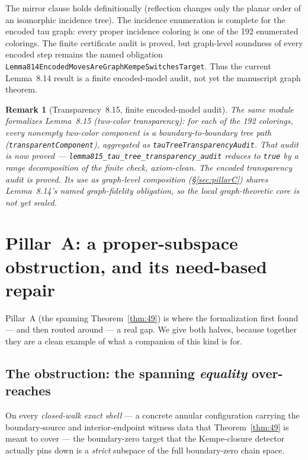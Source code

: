 \documentclass[11pt]{article}
\newtheorem{remark}{Remark}
\theoremstyle{definition}
\begin{document}
The mirror clause holds definitionally (reflection changes only the planar order
of an isomorphic incidence tree). The incidence enumeration is complete for the
encoded tau graph: every proper incidence coloring is one of the 192 enumerated
colorings. The finite certificate audit is proved, but graph-level soundness of
every encoded step remains the named obligation
\texttt{Lemma814EncodedMovesAreGraphKempeSwitchesTarget}. Thus the current
Lemma~8.14 result is a finite encoded-model audit, not yet the manuscript graph
theorem.

\begin{remark}[Transparency~8.15, finite encoded-model audit]
\label{rem:815}
The same module formalizes Lemma~8.15 (two-color transparency): for each of the
192 colorings, every nonempty two-color component is a boundary-to-boundary tree
path (\texttt{transparentComponent}), aggregated as
\texttt{tauTreeTransparencyAudit}. That audit is now \emph{proved} ---
\texttt{lemma815\_tau\_tree\_transparency\_audit} reduces to \texttt{true} by a
range decomposition of the finite check, axiom-clean. The encoded transparency audit is proved. Its use as graph-level composition
(\S\ref{sec:pillarC}) shares Lemma~8.14's named graph-fidelity obligation, so
the local graph-theoretic core is not yet sealed.
\end{remark}

\section{Pillar~A: a proper-subspace obstruction, and its need-based repair}
\label{sec:pillarA}

Pillar~A (the spanning Theorem~\ref{thm:49}) is where the formalization first
found --- and then routed around --- a real gap. We give both halves, because
together they are a clean example of what a companion of this kind is for.

\subsection{The obstruction: the spanning \emph{equality} over-reaches}

On every \emph{closed-walk exact shell} --- a concrete annular configuration
carrying the boundary-source and interior-endpoint witness data that
Theorem~\ref{thm:49} is meant to cover --- the boundary-zero target that the
Kempe-closure detector actually pins down is a \emph{strict} subspace of the full
boundary-zero chain space.
\end{document}
